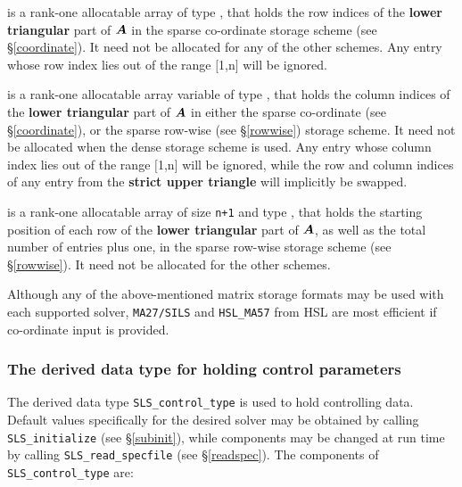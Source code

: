 \documentclass{galahad}
\newcommand{\packagename}{SLS}
\begin{document}
\begin{description}
 is a rank-one allocatable array of type \integer,
that holds the row indices of the {\bf lower triangular} part of ${\bm{A}}$
in the sparse co-ordinate storage
scheme (see \S\ref{coordinate}).
It need not be allocated for any of the other schemes.
Any entry whose row index lies out of the range $[$1,n$]$ will be ignored.

 is a rank-one allocatable array variable of type \integer,
that holds the column indices of the {\bf lower triangular} part of
${\bm{A}}$ in either the sparse co-ordinate
(see \S\ref{coordinate}), or the sparse row-wise
(see \S\ref{rowwise}) storage scheme.
It need not be allocated when the dense
storage scheme is used.
Any entry whose column index lies out of the range $[$1,n$]$ will be ignored,
while the row and column indices of any entry from the
{\bf strict upper triangle} will implicitly be swapped.

 is a rank-one allocatable array of size {\tt n+1} and type
\integer, that holds the starting position of
each row of the {\bf lower triangular} part of ${\bm{A}}$, as well
as the total number of entries plus one, in the sparse row-wise storage
scheme (see \S\ref{rowwise}). It need not be allocated for the
other schemes.

\end{description}
Although any of the above-mentioned matrix storage formats may be used
with each supported solver, {\tt MA27/SILS} and {\tt HSL\_MA57}
from HSL are most efficient if co-ordinate input is provided.


\subsubsection{The derived data type for holding control
 parameters}\label{typecontrol}
The derived data type
{\tt \packagename\_control\_type}
is used to hold controlling data.
Default values specifically for the desired solver
may be obtained by calling
{\tt \packagename\_initialize}
(see \S\ref{subinit}),
while components may be changed at run time by calling
{\tt \packagename\_read\-\_specfile}
(see \S\ref{readspec}).
The components of
{\tt \packagename\_control\_type}
are:
\end{document}
